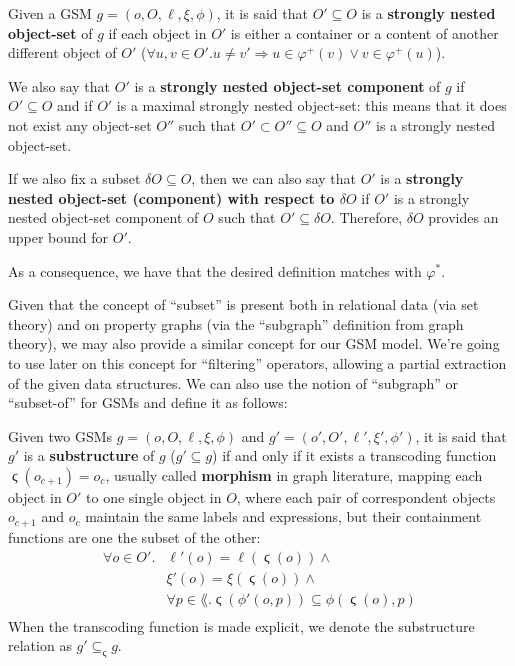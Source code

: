 \begin{definition}\label{def:stronglynestedobjectset}
Given a GSM $g=(o,O,\ell,\xi,\phi)$, it is said that $O'\subseteq O$ is a \textbf{strongly nested object-set} of $g$ if each object in $O'$ is either a container or a content of another different object of $O'$ ($\forall u,v\in O'. u\neq v'\Rightarrow u\in\varphi^+(v)\vee v\in\varphi^+(u)$). \medskip

We also say that $O'$ is a \textbf{strongly nested object-set component} of $g$ if $O'\subseteq O$ and if $O'$ is a maximal strongly nested object-set: this means that it does not exist any object-set $O''$ such that $O'\subset O''\subseteq O$ and $O''$ is a strongly nested object-set. \medskip

If we also fix a subset $\delta O\subseteq O$, then we can also say that $O'$ is a \textbf{strongly nested object-set (component) with respect to $\delta O$} if $O'$ is a strongly nested object-set component of $O$ such that $O'\subseteq \delta O$. Therefore, $\delta O$ provides an upper bound for $O'$.
\end{definition}

As a consequence, we have that the desired definition matches with $\varphi^*$. 

Given that the concept of ``subset'' is present both in relational data (via set theory) and on property graphs (via the ``subgraph'' definition from graph theory), we may also provide a similar concept for our GSM model. We're going to use later on this concept for ``filtering'' operators, allowing a partial extraction of the given data structures. We can also use the notion of ``subgraph'' or ``subset-of'' for GSMs and define it as follows:
\begin{definition}[Substructure]
Given two GSMs $g=(o,O,\ell,\xi,\phi)$ and $g'=(o',O',\ell',\xi',\phi')$, it is said that $g'$ is a \textbf{substructure} of $g$ ($g'\subseteq g$) if and only if it
 exists a transcoding function $\stigma(o_{c+1})=o_c$, usually called \textbf{morphism} in graph literature, mapping each object in $O'$ to one single object in $O$, where each pair of correspondent objects $o_{c+1}$ and $o_c$ maintain the same labels and expressions, but their containment functions are one the subset of the other:
\[\begin{split}
\forall o\in O'. &\ell'(o) = \ell(\stigma(o))\wedge\\
&\xi'(o) = \xi(\stigma(o))\wedge\\
&\forall p\in\lang. \stigma(\phi'(o,p))\subseteq \phi(\stigma(o),p)\\
\end{split}\]
When the transcoding function is made explicit, we denote the substructure relation as $g'\subseteq_\stigma g$.
\end{definition}

